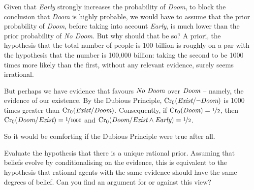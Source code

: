{Given that \emph{Early} strongly increases the probability of
\emph{Doom}, to block the conclusion that \emph{Doom} is highly
probable, we would have to assume that the prior probability of
\emph{Doom}, before taking into account \emph{Early}, is much lower
than the prior probability of \emph{No Doom}. But why should that be
so? A priori, the hypothesis that the total number of people is 100
billion is roughly on a par with the hypothesis that the number is
100,000 billion: taking the second to be 1000 times more likely than
the first, without any relevant evidence, surely seems irrational.

But perhaps we have evidence that favours $\emph{No Doom}$
over $\emph{Doom}$ -- namely, the evidence of our existence. By the
Dubious Principle, $\text{Cr}_0(\emph{Exist}/\neg\emph{Doom})$ is 1000
times greater than $\text{Cr}_0(\emph{Exist}/\emph{Doom})$. Consequently,
if $\text{Cr}_0(\emph{Doom}) = \nicefrac{1}{2}$, then
$\text{Cr}_0(\emph{Doom}/\emph{Exist}) = \nicefrac{1}{1000}$ and
$\text{Cr}_0(\emph{Doom}/\emph{Exist} \land \emph{Early}) = \nicefrac{1}{2}$.

So it would be comforting if the Dubious Principle were true after all.

} %
\begin{essay}
  Evaluate the hypothesis that there is a unique rational prior.
  Assuming that beliefs evolve by conditionalising on the evidence, this is
  equivalent to the hypothesis that rational agents with the same evidence
  should have the same degrees of belief. Can you find an argument for or
  against this view?
\end{essay}

